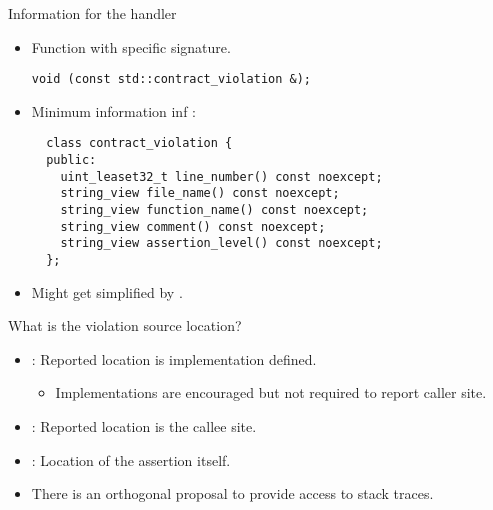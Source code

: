 \begin{frame}[t,fragile]{Information for the handler}
\begin{itemize}
  \item Function with specific signature.
\begin{lstlisting}
void (const std::contract_violation &);
\end{lstlisting}

  \vfill\pause
  \item Minimum information inf :
\begin{lstlisting}
  class contract_violation {
  public:
    uint_leaset32_t line_number() const noexcept;
    string_view file_name() const noexcept;
    string_view function_name() const noexcept;
    string_view comment() const noexcept;
    string_view assertion_level() const noexcept;
  };
\end{lstlisting}

  \vfill\pause
  \item Might get simplified by .
\end{itemize}
\end{frame}

\begin{frame}[t]{What is the violation source location?}
\begin{itemize}
  \item {}: Reported location is implementation defined.
    \begin{itemize}
      \item Implementations are encouraged but not required to report caller site.
    \end{itemize}
  \item {}: Reported location is the callee site.
  \item {}: Location of the assertion itself.
  \vfill
  \item There is an orthogonal proposal to provide access to stack traces.
\end{itemize}
\end{frame}

